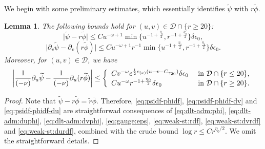 \documentclass[10pt, reqno]{amsart}
\newtheorem{lemma}[theorem]{Lemma}
\theoremstyle{definition}
\theoremstyle{remark}
\theoremstyle{conjecture}
\numberwithin{equation}{section}
\newcommand{\abs}[1]{\vert#1\vert}
\newcommand{\set}[1]{\{#1\}}
\newcommand{\rd}{\partial}
\newcommand{\0}{\emptyset}
\newcommand{\gmm}{\gamma}
\newcommand{\dlt}{\delta}
\newcommand{\eps}{\epsilon}
\newcommand{\omg}{\omega}
\newcommand{\calD}{\mathcal D}
\newcommand{\dur}{\nu}
\newcommand{\phibg}{\overline{\phi}}				%
\newcommand{\psibg}{\overline{\psi}}				%
\newcommand{\rbg}{\overline{r}}					%
\newcommand{\phidf}{\widetilde{\phi}}				%
\newcommand{\psidf}{\widetilde{\psi}}				%
\newcommand{\rdf}{\widetilde{r}}					%
\newcommand{\Abs}[1]{\left\vert #1 \right\vert}
\begin{document}
We begin with some preliminary estimates, which essentially identifies $\psidf$ with $r \phidf$.
\begin{lemma} \label{lem:psidf-phidf}
The following bounds hold for $(u, v) \in \calD \cap \set{r \geq 20}$:
\begin{equation} \label{eq:psidf-phidf}
	\abs{\psidf - r \phidf} \leq C u^{-\omg+1}  \min \set{u^{-1 + \frac{\eta_{0}}{2}}, r^{-1+\frac{\eta_{0}}{2}}} \dlt \eps_{0} ,
\end{equation}
\begin{equation} \label{eq:psidf-phidf-dv}
	\abs{\rd_{v} \psidf - \rd_{v} (r \phidf)} \leq C u^{-\omg+1} r^{-1} \min \set{u^{-1 + \frac{\eta_{0}}{2}}, r^{-1+\frac{\eta_{0}}{2}}} \dlt \eps_{0} .
\end{equation}
Moreover, for $(u, v) \in \calD$, we have 
\begin{equation} \label{eq:psidf-phidf-du}
\Abs{\frac{1}{(-\dur)}\rd_{u} \psidf - \frac{1}{(-\dur)} \rd_{u} (r \phidf)} \leq 
\left\{
\begin{array}{ll}
C v^{-\omg} e^{\frac{1}{2} c_{(\dur)} (u - v - C_{\gmm_{20}}) } \dlt \eps_{0} & \hbox{ in } \calD \cap \set{r \leq 20}, \\
C u^{-\omg} r^{-1+\frac{\eta_{0}}{2}} \dlt \eps_{0} & \hbox{ in } \calD \cap \set{r \geq 20}.
\end{array}
\right. 
\end{equation}
\end{lemma}
\begin{proof}
Note that $\psidf - r \phidf = \rdf \phibg$. Therefore, \eqref{eq:psidf-phidf}, \eqref{eq:psidf-phidf-dv} and \eqref{eq:psidf-phidf-du} are straightforwad consequences of \eqref{eq:dlt-adm:phi}, \eqref{eq:dlt-adm:duphi}, \eqref{eq:dlt-adm:dvphi}, \eqref{eq:gauge:eps}, \eqref{eq:weak-st:rdf}, \eqref{eq:weak-st:dvrdf} and \eqref{eq:weak-st:durdf}, combined with the crude bound $\log r \leq C r^{\eta_{0}/2}$. We omit the straightforward details. \qedhere
\end{proof}
\end{document}
